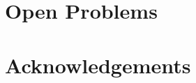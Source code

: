 \documentclass{amsart}
\theoremstyle{plain}
\theoremstyle{definition}
\theoremstyle{remark}
\theoremstyle{plain}
\theoremstyle{definition}
\theoremstyle{remark}
\begin{document}
\section{Open Problems}

\section*{Acknowledgements}

  
  
\end{document}
